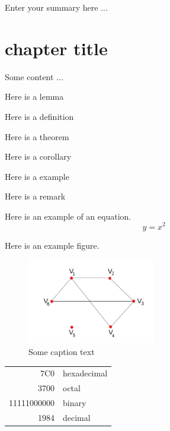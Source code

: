\documentclass{pdfmx4020}
\begin{document}
\mxfrontpage

\begin{Summary}
Enter your summary here ...
\end{Summary}

\StartThesis

\chapter{chapter title}
Some content ...

\begin{lemma}  
Here is a lemma
\end{lemma}

\begin{definition}  
Here is a definition\cite{c1}
\end{definition}

\begin{theorem}  
Here is a theorem
\end{theorem}

\begin{corollary}  
Here is a corollary
\end{corollary}

\begin{example}  
Here is a example
\end{example}

\begin{remark}  
Here is a remark
\end{remark}

Here is an example of an equation.
\begin{equation*}  
y = x^2
\end{equation*}

Here is an example figure.
\begin{figure}[htbp]
	\centering
		\includegraphics[width=0.50\textwidth]{graph.png}
	\caption{Some caption text}
	\label{fig:graph}
\end{figure}

\begin{tabular}{|r|l|}
  \hline
  7C0 & hexadecimal \\
  3700 & octal \\ \cline{2-2}
  11111000000 & binary \\
  \hline \hline
  1984 & decimal \\
  \hline
\end{tabular}
\end{document}
